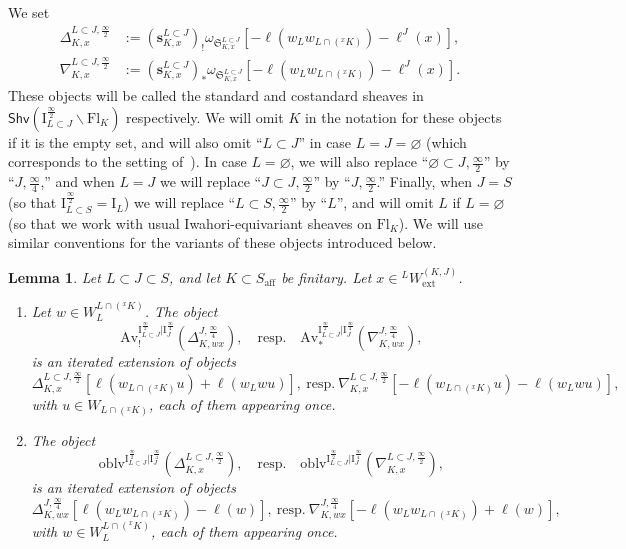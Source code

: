 \documentclass[11pt]{amsart}
\numberwithin{equation}{section}
\theoremstyle{plain}
\newtheorem{lem}[thm]{Lemma}
\theoremstyle{definition}
\newcommand{\I}{{\mathrm I}}
\newcommand{\semi}{{{\frac{\infty}{2}}}}
\newcommand{\quar}{{{\frac{\infty}{4}}}}
\newcommand{\oblv}{\mathrm{oblv}}
\newcommand{\Av}{\mathrm{Av}}
\newcommand{\ex}{\mathrm{ext}}
\newcommand{\af}{\mathrm{aff}}
\newcommand{\Shv}{\mathsf{Shv}}
\newcommand{\Fl}{\mathrm{Fl}}
\newcommand{\bs}{\mathbf{s}}
\newcommand{\rS}{\mathfrak{S}}
\begin{document}
We set
\begin{align*}
\Delta^{L \subset J,\semi}_{K,x} &:= (\bs^{L \subset J}_{K,x})_! \omega_{\rS^{L \subset J}_{K,x}}[-\ell(w_L w_{L \cap ({}^xK)})-\ell^J(x)], \\ 
\nabla^{L \subset J,\semi}_{K,x} &:= (\bs^{L \subset J}_{K,x})_* \omega_{\rS^{L \subset J}_{K,x}}[-\ell(w_L w_{L \cap ({}^xK)})-\ell^J(x)].
\end{align*}
These objects will be called the standard and costandard sheaves in $\Shv \left( \I^{\semi}_{L \subset J} \backslash \Fl_{K} \right)$ respectively.
We will omit $K$ in the notation for these objects if it is the empty set, and will also omit ``$L \subset J$'' in case $L=J=\varnothing$ (which corresponds to the setting of~\cite{adr}). In case $L=\varnothing$, we will also replace  ``$\varnothing \subset J, \semi$'' by ``$J,\quar$,'' and when $L=J$ we will replace ``$J \subset J, \semi$'' by ``$J,\semi$.'' Finally, when $J=S$ (so that $\I_{L \subset S}^\semi = \I_L$) we will replace ``$L \subset S, \semi$'' by ``$L$'', and will omit $L$ if $L=\varnothing$ (so that we work with usual Iwahori-equivariant sheaves on $\Fl_K$). We will use similar conventions for the variants of these objects introduced below.

\begin{lem}
\label{lem:Av-quar-semi-D-N}
Let $L \subset J \subset S$, and let $K \subset S_\af$ be finitary.
Let $x\in {}^LW_\ex^{(K,J)}$. 
\begin{enumerate}
\item 
\label{it:Av-quar-semi-D-N-1}
Let $w\in W_L^{L\cap ({}^x K)}$. 
The object 
\[
\Av_!^{\I_{L \subset J}^{\semi}|\I_J^{\quar}}(\Delta^{J,\quar}_{K,wx}), \quad 
\text{resp.}\quad \Av_*^{\I_{L \subset J}^{\semi}|\I_J^{\quar}}(\nabla^{J,\quar}_{K,wx}),
\]
is an iterated extension of objects
\[
\Delta^{L \subset J,\semi}_{K,x}[\ell(w_{L\cap ({}^xK)}u)+\ell(w_Lwu)], \
\text{resp.}\ \nabla^{L \subset J,\semi}_{K,x}[-\ell(w_{L\cap ({}^xK)}u)-\ell(w_Lwu)],
\]
with $u\in W_{L\cap ({}^xK)}$, each of them appearing once. 
\item 
\label{it:Av-quar-semi-D-N-2}
The object 
\[
\oblv^{\I_{L \subset J}^{\semi}|\I_J^{\quar}}(\Delta^{L \subset J,\semi}_{K,x}), 
\quad \text{resp.}\quad 
\oblv^{\I_{L \subset J}^{\semi}|\I_J^{\quar}}(\nabla^{L \subset J,\semi}_{K,x}),
\]
is an iterated extension of objects
\[
\Delta^{J,\quar}_{K,wx}[\ell(w_L w_{L\cap ({}^xK)})-\ell(w)], 
\ \text{resp.}\ 
\nabla^{J,\quar}_{K,wx}[-\ell(w_L w_{L \cap ({}^xK)})+\ell(w)],
\]
with $w\in W_L^{L\cap ({}^xK)}$, each of them appearing once. 
\end{enumerate}
\end{lem}
\end{document}
